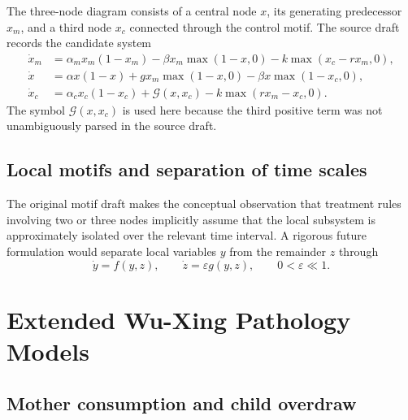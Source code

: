 \documentclass[11pt, reqno]{amsart}
\theoremstyle{definition}
\theoremstyle{remark}
\newcommand{\eps}{\varepsilon}
\begin{document}
	The three-node diagram consists of a central node $x$, its generating
	predecessor $x_m$, and a third node $x_c$ connected through the control motif.
	The source draft records the candidate system
	\begin{equation}
		\label{eq:three-node-source}
		\begin{aligned}
			\dot x_m
			&=
			\alpha_mx_m(1-x_m)
			-\beta x_m\max(1-x,0)
			-k\max(x_c-rx_m,0),\\
			\dot x
			&=
			\alpha x(1-x)
			+g x_m\max(1-x,0)
			-\beta x\max(1-x_c,0),\\
			\dot x_c
			&=
			\alpha_cx_c(1-x_c)
			+\mathcal G(x,x_c)
			-k\max(rx_m-x_c,0).
		\end{aligned}
	\end{equation}
	The symbol $\mathcal G(x,x_c)$ is used here because the third positive term was
	not unambiguously parsed in the source draft.
	
	
	\subsection{Local motifs and separation of time scales}
	
	The original motif draft makes the conceptual observation that treatment rules
	involving two or three nodes implicitly assume that the local subsystem is
	approximately isolated over the relevant time interval.  A rigorous future
	formulation would separate local variables $y$ from the remainder $z$ through
	\begin{equation}
		\label{eq:slow-fast-motif}
		\dot y=f(y,z),
		\qquad
		\dot z=\eps g(y,z),
		\qquad
		0<\eps\ll1.
	\end{equation}
	
	
	\section{Extended Wu-Xing Pathology Models}
	\label{app:pathologies}
	
	\subsection{Mother consumption and child overdraw}
	
\end{document}
